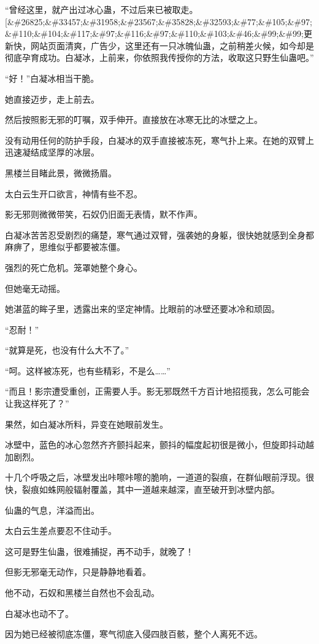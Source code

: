 \begin{this_body}
“曾经这里，就产出过冰心蛊，不过后来已被取走。[\&\#26825;\&\#33457;\&\#31958;\&\#23567;\&\#35828;\&\#32593;\&\#77;\&\#105;\&\#97;\&\#110;\&\#104;\&\#117;\&\#97;\&\#116;\&\#97;\&\#110;\&\#103;\&\#46;\&\#99;\&\#99;更新快，网站页面清爽，广告少，这里还有一只冰魄仙蛊，之前稍差火候，如今却是彻底孕育成功。白凝冰，上前来，你依照我传授你的方法，收取这只野生仙蛊吧。”

“好！”白凝冰相当干脆。

她直接迈步，走上前去。

然后按照影无邪的叮嘱，双手伸开。直接放在冰寒无比的冰壁之上。

没有动用任何的防护手段，白凝冰的双手直接被冻死，寒气扑上来。在她的双臂上迅速凝结成坚厚的冰层。

黑楼兰目睹此景，微微扬眉。

太白云生开口欲言，神情有些不忍。

影无邪则微微带笑，石奴仍旧面无表情，默不作声。

白凝冰苦苦忍受剧烈的痛楚，寒气通过双臂，强袭她的身躯，很快她就感到全身都麻痹了，思维似乎都要被冻僵。

强烈的死亡危机。笼罩她整个身心。

但她毫无动摇。

她湛蓝的眸子里，透露出来的坚定神情。比眼前的冰壁还要冰冷和顽固。

“忍耐！”

“就算是死，也没有什么大不了。”

“呵。这样被冻死，也有些精彩，不是么……”

“而且！影宗遭受重创，正需要人手。影无邪既然千方百计地招揽我，怎么可能会让我这样死了？”

果然，如白凝冰所料，异变在她眼前发生。

冰壁中，蓝色的冰心忽然齐齐颤抖起来，颤抖的幅度起初很是微小，但旋即抖动越加剧烈。

十几个呼吸之后，冰壁发出咔嚓咔嚓的脆响，一道道的裂痕，在群仙眼前浮现。很快，裂痕如蛛网般辐射覆盖，其中一道越来越深，直至破开到冰壁内部。

仙蛊的气息，洋溢而出。

太白云生差点要忍不住动手。

这可是野生仙蛊，很难捕捉，再不动手，就晚了！

但影无邪毫无动作，只是静静地看着。

他不动，石奴和黑楼兰自然也不会乱动。

白凝冰也动不了。

因为她已经被彻底冻僵，寒气彻底入侵四肢百骸，整个人离死不远。


\end{this_body}
